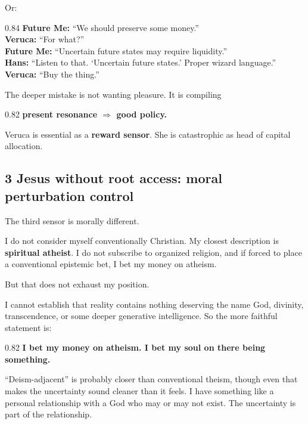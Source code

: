 \documentclass[10pt,letterpaper]{article}
\newenvironment{paperbody}
  {\begingroup\justifying}
  {\par\endgroup}
\newenvironment{dialoguebox}
  {\Needspace{5\baselineskip}\par\vspace{0.26em}\begin{center}\begingroup
   \begin{lrbox}{\dialogueboxsave}\begin{varwidth}{0.84\linewidth}
   \small\rmfamily\upshape\RaggedRight}
  {\end{varwidth}\end{lrbox}\fbox{\usebox{\dialogueboxsave}}
   \endgroup\end{center}\vspace{0.26em}}
\newenvironment{thesisbox}
  {\Needspace{3.5\baselineskip}\par\vspace{0.32em}\begin{center}\begingroup
   \begin{lrbox}{\thesisboxsave}\begin{varwidth}{0.82\linewidth}
   \normalsize\rmfamily\bfseries\upshape\RaggedRight}
  {\end{varwidth}\end{lrbox}\fbox{\usebox{\thesisboxsave}}
   \endgroup\end{center}\vspace{0.32em}}
\let\oldsubsection\subsection
\renewcommand{\subsection}{\Needspace{5\baselineskip}\oldsubsection}
\begin{document}
\begin{paperbody}
Or:

\begin{dialoguebox}
\textbf{Future Me:} ``We should preserve some money.''\\[0.35em]
\textbf{Veruca:} ``For what?''\\[0.35em]
\textbf{Future Me:} ``Uncertain future states may require liquidity.''\\[0.35em]
\textbf{Hans:} ``Listen to that. `Uncertain future states.' Proper
wizard language.''\\[0.35em]
\textbf{Veruca:} ``Buy the thing.''
\end{dialoguebox}

The deeper mistake is not wanting pleasure. It is compiling

\begin{thesisbox}
present resonance \(\Rightarrow\) good policy.
\end{thesisbox}

Veruca is essential as a \textbf{reward sensor}. She is catastrophic as
head of capital allocation.

\subsection{3 Jesus without root access: moral perturbation
control}\label{jesus-without-root-access-moral-perturbation-control}

The third sensor is morally different.

I do not consider myself conventionally Christian. My closest
description is \textbf{spiritual atheist}. I do not subscribe to
organized religion, and if forced to place a conventional epistemic bet,
I bet my money on atheism.

But that does not exhaust my position.

I cannot establish that reality contains nothing deserving the name God,
divinity, transcendence, or some deeper generative intelligence. So the
more faithful statement is:

\begin{thesisbox}
I bet my money on atheism. I bet my soul on there being
something.
\end{thesisbox}

``Deism-adjacent'' is probably closer than conventional theism, though
even that makes the uncertainty sound cleaner than it feels. I have
something like a personal relationship with a God who may or may not
exist. The uncertainty is part of the relationship.


\end{paperbody}
\end{document}
